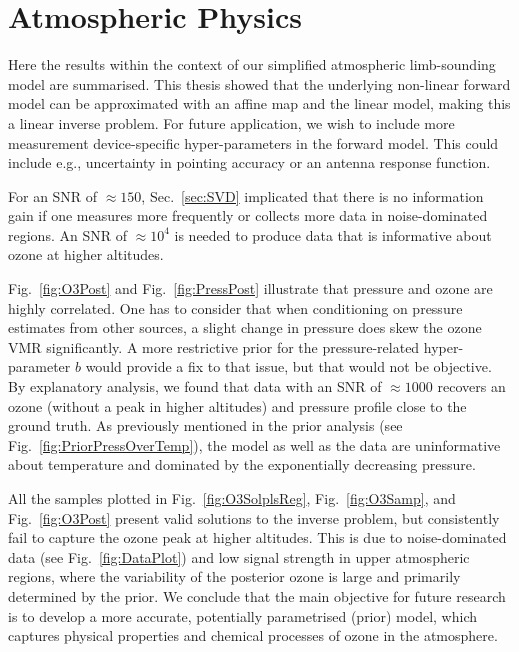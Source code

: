 \section{Atmospheric Physics}
Here the results within the context of our simplified atmospheric limb-sounding model are summarised.
This thesis showed that the underlying non-linear forward model can be approximated with an affine map and the linear model, making this a linear inverse problem.
For future application, we wish to include more measurement device-specific hyper-parameters in the forward model.
This could include e.g., uncertainty in pointing accuracy or an antenna response function.

For an SNR of $\approx150$, Sec.~\ref{sec:SVD} implicated that there is no information gain if one measures more frequently or collects more data in noise-dominated regions.
An SNR of $\approx10^4$ is needed to produce data that is informative about ozone at higher altitudes.

Fig.~\ref{fig:O3Post} and Fig.~\ref{fig:PressPost} illustrate that pressure and ozone are highly correlated.
One has to consider that when conditioning on pressure estimates from other sources, a slight change in pressure does skew the ozone VMR significantly.
A more restrictive prior for the pressure-related hyper-parameter $b$ would provide a fix to that issue, but that would not be objective.
By explanatory analysis, we found that data with an SNR of $\approx 1000$ recovers an ozone (without a peak in higher altitudes) and pressure profile close to the ground truth.
As previously mentioned in the prior analysis (see Fig.~\ref{fig:PriorPressOverTemp}), the model as well as the data are uninformative about temperature and dominated by the exponentially decreasing pressure.

All the samples plotted in Fig.~\ref{fig:O3SolplsReg}, Fig.~\ref{fig:O3Samp}, and Fig.~\ref{fig:O3Post} present valid solutions to the inverse problem, but consistently fail to capture the ozone peak at higher altitudes.
This is due to noise-dominated data (see Fig.~\ref{fig:DataPlot}) and low signal strength in upper atmospheric regions, where the variability of the posterior ozone is large and primarily determined by the prior.
We conclude that the main objective for future research is to develop a more accurate, potentially parametrised (prior) model, which captures physical properties and chemical processes of ozone in the atmosphere.




